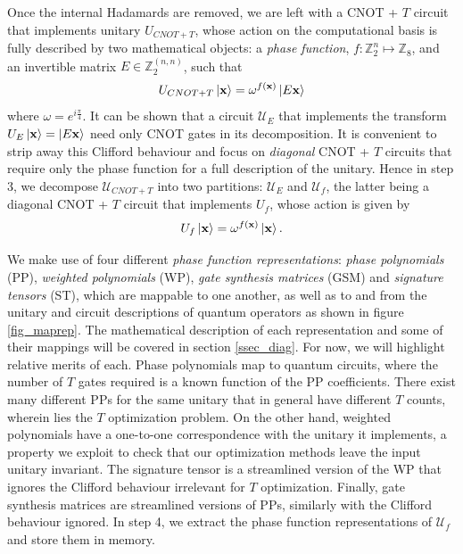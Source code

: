 \documentclass[notitlepage]{article}
\theoremstyle{definition}
\theoremstyle{problem}
\theoremstyle{lemma}
\begin{document}
Once the internal Hadamards are removed, we are left with a CNOT + $T$ circuit 
that implements unitary $U_{CNOT+T}$, whose action on the computational basis is fully described by two mathematical objects: a \emph{phase function}, $f: \mathbb{Z}_2^n \mapsto \mathbb{Z}_8$, and an invertible matrix $E \in \mathbb{Z}_2^{(n,n)}$, such that
\begin{equation}
U_{CNOT+T}\left\vert{\mathbf{x}}\right\rangle = \omega^{f(\mathbf{x})}\left\vert{E\mathbf{x}}\right\rangle
\end{equation}
where $\omega = e^{i\frac{\pi}{4}}$. It can be shown that a circuit $\mathcal{U}_E$ that implements the transform $U_E\left\vert{\mathbf{x}}\right\rangle=\left\vert{E\mathbf{x}}\right\rangle$ need only CNOT gates in its decomposition. It is convenient to strip away this Clifford behaviour and focus on \emph{diagonal} CNOT + $T$ circuits that require only the phase function for a full description of the unitary.
Hence in step 3, we decompose $\mathcal{U}_{CNOT+T}$ into two partitions: $\mathcal{U}_E$ and $\mathcal{U}_f$, the latter being a diagonal CNOT + $T$ circuit that implements $U_f$, whose action is given by
\begin{equation}
U_f\left\vert{\mathbf{x}}\right\rangle = \omega^{f(\mathbf{x})}\left\vert{\mathbf{x}}\right\rangle.
\end{equation}

We make use of four different \emph{phase function representations}: \emph{phase polynomials} (PP), \emph{weighted polynomials} (WP), \emph{gate synthesis matrices} (GSM) and \emph{signature tensors} (ST), which are mappable to one another, as well as to and from the unitary and circuit descriptions of quantum operators as shown in figure \ref{fig_maprep}. The mathematical description of each representation and some of their mappings will be covered in section \ref{ssec_diag}. For now, we will highlight relative merits of each.
Phase polynomials map to quantum circuits, where the number of $T$ gates required is a known function of the PP coefficients.
There exist many different PPs for the same unitary that in general have different $T$ counts, wherein lies the $T$ optimization problem. On the other hand, weighted polynomials have a one-to-one correspondence with the unitary it implements, a property we exploit to check that our optimization methods leave the input unitary invariant. The signature tensor is a streamlined version of the WP that ignores the Clifford behaviour irrelevant for $T$ optimization. Finally, gate synthesis matrices are streamlined versions of PPs, similarly with the Clifford behaviour ignored. In step 4, we extract the phase function representations of $\mathcal{U}_f$ and store them in memory.
\end{document}
